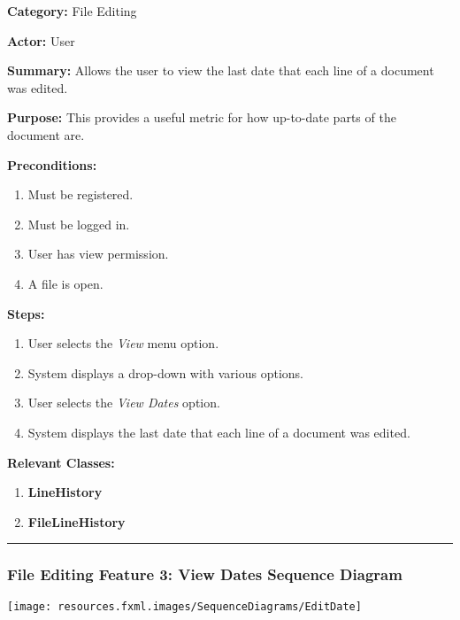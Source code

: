 \documentclass[twoside,letterpaper]{article}
\begin{document}
	\noindent\textbf{Category:} File Editing \newline

	\noindent\textbf{Actor:} User \newline
	
	\noindent\textbf{Summary:} Allows the user to view the last date that each line of a document was edited. \newline
	
	\noindent\textbf{Purpose:} This provides a useful metric for how up-to-date parts of the document are. \newline
	
	\noindent\textbf{Preconditions:}
	\begin{enumerate}
		\item Must be registered.
		\item Must be logged in.
		\item User has view permission.
		\item A file is open.
	\end{enumerate}
	\noindent\textbf{Steps:}
	\begin{enumerate}
		\item User selects the \textit{View} menu option.
		\item System displays a drop-down with various options.
		\item User selects the \textit{View Dates} option.
		\item System displays the last date that each line of a document was edited.
	\end{enumerate}
	\noindent\textbf{Relevant Classes:}
	\begin{enumerate}
		\item \textbf {LineHistory}
		\item \textbf {FileLineHistory}
	\end{enumerate}
\vspace{8pt}
\hrule
\newpage

\subsubsection[File Editing Feature 3: View Dates Sequence Diagram]{\rmfamily\bfseries\color{black}
	File Editing Feature 3: View Dates Sequence Diagram}
\hypertarget{RefHeading22059017292}{}

\bigskip

\texttt{[image: resources.fxml.images/SequenceDiagrams/EditDate]}
\end{document}
